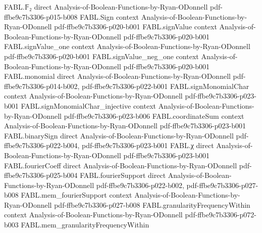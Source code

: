 \begin{theorem}
\label{FABL.BooleanCircuit.toWidthThreeCNF_width_le}
\leanok
{}
\proofstep
  {FABL.𝔽₂}
  {direct}
  {Analysis-of-Boolean-Functions-by-Ryan-ODonnell}
  {pdf-ffbe9c7b3306-p015-b008}
\proofstep
  {FABL.Sign}
  {context}
  {Analysis-of-Boolean-Functions-by-Ryan-ODonnell}
  {pdf-ffbe9c7b3306-p020-b001}
\proofstep
  {FABL.signValue}
  {context}
  {Analysis-of-Boolean-Functions-by-Ryan-ODonnell}
  {pdf-ffbe9c7b3306-p020-b001}
\proofstep
  {FABL.signValue_one}
  {context}
  {Analysis-of-Boolean-Functions-by-Ryan-ODonnell}
  {pdf-ffbe9c7b3306-p020-b001}
\proofstep
  {FABL.signValue_neg_one}
  {context}
  {Analysis-of-Boolean-Functions-by-Ryan-ODonnell}
  {pdf-ffbe9c7b3306-p020-b001}
\proofstep
  {FABL.monomial}
  {direct}
  {Analysis-of-Boolean-Functions-by-Ryan-ODonnell}
  {pdf-ffbe9c7b3306-p014-b002,
    pdf-ffbe9c7b3306-p022-b001}
\proofstep
  {FABL.signMonomialChar}
  {context}
  {Analysis-of-Boolean-Functions-by-Ryan-ODonnell}
  {pdf-ffbe9c7b3306-p023-b001}
\proofstep
  {FABL.signMonomialChar_injective}
  {context}
  {Analysis-of-Boolean-Functions-by-Ryan-ODonnell}
  {pdf-ffbe9c7b3306-p023-b006}
\proofstep
  {FABL.coordinateSum}
  {context}
  {Analysis-of-Boolean-Functions-by-Ryan-ODonnell}
  {pdf-ffbe9c7b3306-p023-b001}
\proofstep
  {FABL.binarySign}
  {direct}
  {Analysis-of-Boolean-Functions-by-Ryan-ODonnell}
  {pdf-ffbe9c7b3306-p022-b004,
    pdf-ffbe9c7b3306-p023-b001}
\proofstep
  {FABL.χ}
  {direct}
  {Analysis-of-Boolean-Functions-by-Ryan-ODonnell}
  {pdf-ffbe9c7b3306-p023-b001}
\proofstep
  {FABL.fourierCoeff}
  {direct}
  {Analysis-of-Boolean-Functions-by-Ryan-ODonnell}
  {pdf-ffbe9c7b3306-p025-b004}
\proofstep
  {FABL.fourierSupport}
  {direct}
  {Analysis-of-Boolean-Functions-by-Ryan-ODonnell}
  {pdf-ffbe9c7b3306-p022-b002,
    pdf-ffbe9c7b3306-p027-b008}
\proofstep
  {FABL.mem_fourierSupport}
  {context}
  {Analysis-of-Boolean-Functions-by-Ryan-ODonnell}
  {pdf-ffbe9c7b3306-p027-b008}
\proofstep
  {FABL.granularityFrequencyWithin}
  {context}
  {Analysis-of-Boolean-Functions-by-Ryan-ODonnell}
  {pdf-ffbe9c7b3306-p072-b003}
\proofstep
  {FABL.mem_granularityFrequencyWithin}

\end{theorem}
